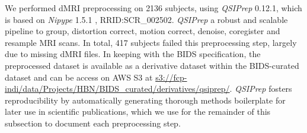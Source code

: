 \documentclass[fleqn,10pt]{wlscirep}
\begin{document}
We performed dMRI preprocessing on \num{2136} subjects, using \emph{QSIPrep}
\cite{cieslak2021-iq} 0.12.1, which is based on \emph{Nipype} 1.5.1
\cite{nipype1,nipype2}, RRID:SCR\_002502. \emph{QSIPrep} a robust and scalable
pipeline to group, distortion correct, motion correct, denoise, coregister and
resample MRI scans.  In total, \num{417} subjects failed this preprocessing
step, largely due to missing dMRI files. In keeping with the BIDS specification,
the preprocessed dataset is available as a derivative dataset within the
BIDS-curated dataset and can be access on AWS S3 at
\url{s3://fcp-indi/data/Projects/HBN/BIDS_curated/derivatives/qsiprep/}.
\emph{QSIPrep} fosters reproducibility by automatically generating thorough
methods boilerplate for later use in scientific publications, which we use for
the remainder of this subsection to document each preprocessing step.
\end{document}
